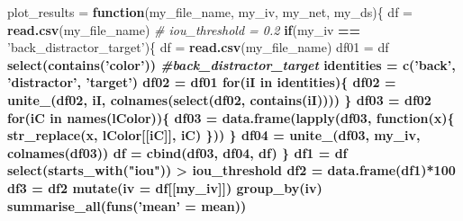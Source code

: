 \documentclass[]{article}
\newenvironment{Shaded}{\begin{snugshade}}{\end{snugshade}}
\newcommand{\KeywordTok}[1]{\textcolor[rgb]{0.13,0.29,0.53}{\textbf{#1}}}
\newcommand{\DataTypeTok}[1]{\textcolor[rgb]{0.13,0.29,0.53}{#1}}
\newcommand{\DecValTok}[1]{\textcolor[rgb]{0.00,0.00,0.81}{#1}}
\newcommand{\StringTok}[1]{\textcolor[rgb]{0.31,0.60,0.02}{#1}}
\newcommand{\CommentTok}[1]{\textcolor[rgb]{0.56,0.35,0.01}{\textit{#1}}}
\newcommand{\ControlFlowTok}[1]{\textcolor[rgb]{0.13,0.29,0.53}{\textbf{#1}}}
\newcommand{\OperatorTok}[1]{\textcolor[rgb]{0.81,0.36,0.00}{\textbf{#1}}}
\newcommand{\NormalTok}[1]{#1}
\begin{document}
\begin{Shaded}
\begin{Highlighting}[]
\NormalTok{plot_results =}\StringTok{ }\ControlFlowTok{function}\NormalTok{(my_file_name, my_iv, my_net, my_ds)\{}
\NormalTok{  df =}\StringTok{ }\KeywordTok{read.csv}\NormalTok{(my_file_name)}
  \CommentTok{# iou_threshold = 0.2}
  \ControlFlowTok{if}\NormalTok{(my_iv }\OperatorTok{==}\StringTok{ 'back_distractor_target'}\NormalTok{)\{}
\NormalTok{    df =}\StringTok{ }\KeywordTok{read.csv}\NormalTok{(my_file_name)}
\NormalTok{    df01 =}\StringTok{ }\NormalTok{df }\OperatorTok{%>%}
\StringTok{      }\KeywordTok{select}\NormalTok{(}\KeywordTok{contains}\NormalTok{(}\StringTok{'color'}\NormalTok{)) }\CommentTok{#back_distractor_target}
\NormalTok{    identities =}\StringTok{ }\KeywordTok{c}\NormalTok{(}\StringTok{'back'}\NormalTok{, }\StringTok{'distractor'}\NormalTok{, }\StringTok{'target'}\NormalTok{)}
\NormalTok{    df02 =}\StringTok{ }\NormalTok{df01}
    \ControlFlowTok{for}\NormalTok{(iI }\ControlFlowTok{in}\NormalTok{ identities)\{}
\NormalTok{      df02 =}\StringTok{ }\KeywordTok{unite_}\NormalTok{(df02, iI, }\KeywordTok{colnames}\NormalTok{(}\KeywordTok{select}\NormalTok{(df02, }\KeywordTok{contains}\NormalTok{(iI))))}
\NormalTok{    \}}
\NormalTok{    df03 =}\StringTok{ }\NormalTok{df02}
    \ControlFlowTok{for}\NormalTok{(iC }\ControlFlowTok{in} \KeywordTok{names}\NormalTok{(lColor))\{}
\NormalTok{      df03 =}\StringTok{ }\KeywordTok{data.frame}\NormalTok{(}\KeywordTok{lapply}\NormalTok{(df03, }\ControlFlowTok{function}\NormalTok{(x)\{}
      \KeywordTok{str_replace}\NormalTok{(x, lColor[[iC]], iC)}
\NormalTok{      \}))}
\NormalTok{    \}}
\NormalTok{    df04 =}\StringTok{ }\KeywordTok{unite_}\NormalTok{(df03, my_iv, }\KeywordTok{colnames}\NormalTok{(df03))}
\NormalTok{    df =}\StringTok{ }\KeywordTok{cbind}\NormalTok{(df03, df04, df) }
\NormalTok{  \}}
\NormalTok{  df1 =}\StringTok{ }\NormalTok{df }\OperatorTok{%>%}
\StringTok{    }\KeywordTok{select}\NormalTok{(}\KeywordTok{starts_with}\NormalTok{(}\StringTok{"iou"}\NormalTok{)) }\OperatorTok{>}\StringTok{ }\NormalTok{iou_threshold}
\NormalTok{  df2 =}\StringTok{ }\KeywordTok{data.frame}\NormalTok{(df1)}\OperatorTok{*}\DecValTok{100}
\NormalTok{  df3 =}\StringTok{ }\NormalTok{df2 }\OperatorTok{%>%}
\StringTok{    }\KeywordTok{mutate}\NormalTok{(}\DataTypeTok{iv =}\NormalTok{ df[[my_iv]]) }\OperatorTok{%>%}
\StringTok{    }\KeywordTok{group_by}\NormalTok{(iv) }\OperatorTok{%>%}
\StringTok{    }\KeywordTok{summarise_all}\NormalTok{(}\KeywordTok{funs}\NormalTok{(}\StringTok{'mean'}\NormalTok{ =}\StringTok{ }\NormalTok{mean))}
}}}}}
\end{Highlighting}
\end{Shaded}
\end{document}
